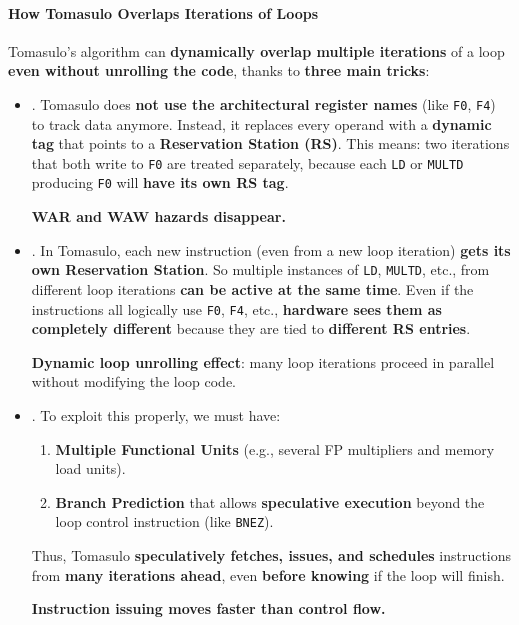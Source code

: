 \paragraph{How Tomasulo Overlaps Iterations of Loops}

Tomasulo's algorithm can \textbf{dynamically overlap multiple iterations} of a loop \textbf{even without unrolling the code}, thanks to \textbf{three main tricks}:
\begin{itemize}
    \item {}. Tomasulo does \textbf{not use the architectural register names} (like \texttt{F0}, \texttt{F4}) to track data anymore. Instead, it replaces every operand with a \textbf{dynamic tag} that points to a \textbf{Reservation Station (RS)}. This means: two iterations that both write to \texttt{F0} are treated separately, because each \texttt{LD} or \texttt{MULTD} producing \texttt{F0} will \textbf{have its own RS tag}.
    
    \textcolor{Green3}{ \textbf{WAR and WAW hazards disappear.}}
    

    \item {}. In Tomasulo, each new instruction (even from a new loop iteration) \textbf{gets its own Reservation Station}. So multiple instances of \texttt{LD}, \texttt{MULTD}, etc., from different loop iterations \textbf{can be active at the same time}. Even if the instructions all logically use \texttt{F0}, \texttt{F4}, etc., \textbf{hardware sees them as completely different} because they are tied to \textbf{different RS entries}.
    
    \textcolor{Green3}{ \textbf{Dynamic loop unrolling effect}}: many loop iterations proceed in parallel without modifying the loop code.

    
    \item {}. To exploit this properly, we must have:
    \begin{enumerate}
        \item \textbf{Multiple Functional Units} (e.g., several FP multipliers and memory load units).
        \item \textbf{Branch Prediction} that allows \textbf{speculative execution} beyond the loop control instruction (like \texttt{BNEZ}).
    \end{enumerate}
    Thus, Tomasulo \textbf{speculatively fetches, issues, and schedules} instructions from \textbf{many iterations ahead}, even \textbf{before knowing} if the loop will finish.

    \textcolor{Green3}{ \textbf{Instruction issuing moves faster than control flow.}}
\end{itemize}
